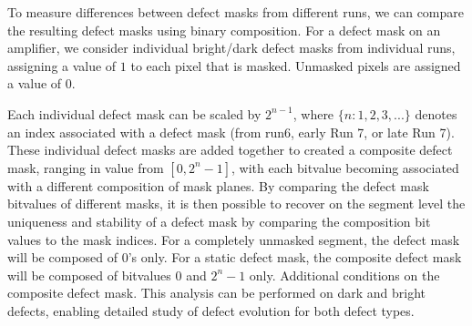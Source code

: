 To measure differences between defect masks from different runs, we can compare the resulting defect masks using binary composition. For a defect mask on an amplifier, we consider individual bright/dark defect masks from individual runs, assigning a value of $1$ to each pixel that is masked. Unmasked pixels are assigned a value of $0$.


Each individual defect mask can be scaled by $2^{n-1}$, where $\{n:1,2,3,... \}$ denotes an index associated with a defect mask (from run6, early Run 7, or late Run 7). These individual defect masks are added together to created a composite defect mask, ranging in value from $[0,2^{n}-1]$, with each bitvalue becoming associated with a different composition of mask planes. By comparing the defect mask bitvalues of different masks, it is then possible to recover on the segment level the uniqueness and stability of a defect mask by comparing the composition bit values to the mask indices. For a completely unmasked segment, the defect mask will be composed of 0's only. For a static defect mask, the composite defect mask will be composed of bitvalues 0 and $2^n-1$ only. Additional conditions on the composite defect mask. This analysis can be performed on dark and bright defects, enabling detailed study of defect evolution for both defect types. 


